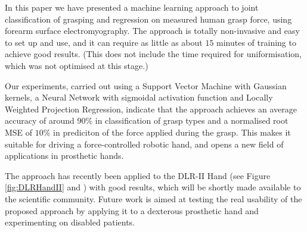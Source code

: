 In this paper we have presented a machine learning approach to joint
classification of grasping and regression on measured human grasp
force, using forearm surface electromyography. The approach is totally
non-invasive and easy to set up and use, and it can require as little
as about $15$ minutes of training to achieve good results. (This does
not include the time required for uniformisation, which was not
optimised at this stage.)

Our experiments, carried out using a Support Vector Machine with
Gaussian kernels, a Neural Network with sigmoidal activation
function and Locally Weighted Projection Regression, indicate that
the approach achieves an average accuracy of around $90\%$ in
classification of grasp types and a normalised root MSE of $10\%$
in prediciton of the force applied during the grasp. This makes it
suitable for driving a force-controlled robotic hand, and opens a
new field of applications in prosthetic hands.

The approach has recently been applied to the DLR-II Hand (see Figure
\ref{fig:DLRHandII} and \cite{ButFisGre2004}) with good results, which
will be shortly made available to the scientific community. Future
work is aimed at testing the real usability of the proposed approach
by applying it to a dexterous prosthetic hand and experimenting on
disabled patients.

